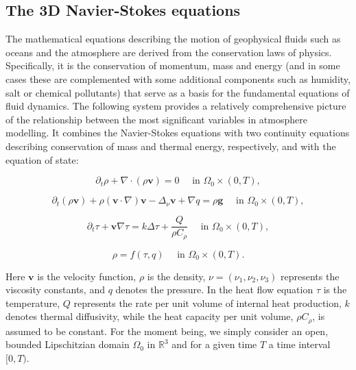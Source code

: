 \documentclass[12pt]{report}
\numberwithin{theorem}{chapter}
\numberwithin{corollary}{chapter}
\numberwithin{lemma}{chapter}
\numberwithin{remark}{chapter}
\numberwithin{definition}{chapter}
\numberwithin{prop}{chapter}
\begin{document}
\subsection{The 3D Navier-Stokes equations}\label{3DNSgeneraldescription}

The mathematical equations describing the motion of geophysical fluids such as oceans and the atmosphere are derived from the conservation laws of physics. Specifically, it is the conservation of momentum, mass and energy (and in some cases these are complemented with some additional components such as humidity, salt or chemical pollutants) that serve as a basis for the fundamental equations of fluid dynamics. The following system provides a relatively comprehensive picture of the relationship between the most significant variables in atmosphere modelling. It combines the Navier-Stokes equations with two continuity equations describing conservation of mass and thermal energy, respectively, and with the equation of state:

\begin{equation} \label{original_general_mass_cons}
  \partial_t \rho + \nabla \cdot (\rho \mathbf{v})  = 0 \quad \text{ in } \Omega_0 \times (0,T),
\end{equation}

\begin{equation} \label{original_general_NS}
  \partial_t (\rho \mathbf{v}) + \rho (\mathbf{v} \cdot \nabla)\mathbf{v} -\Delta_{\nu} \mathbf{v} + \nabla q = \rho \mathbf{g} \quad \text{ in } \Omega_0 \times (0,T),
\end{equation}

\begin{equation} \label{original_general_temperature}
  \partial_t \tau + \mathbf{v} \nabla \tau = k \Delta \tau + \frac{Q}{\rho C_\rho} \quad \text{ in } \Omega_0 \times (0,T),
\end{equation}

\begin{equation}\label{equation_of_state}
  \rho = f(\tau, q)  \quad \text{ in } \Omega_0 \times (0,T).
\end{equation}

Here $\mathbf{v}$ is the velocity function, $\rho$ is the density, $\nu = (\nu_1, \nu_2, \nu_3)$ represents the viscosity constants, and $q$ denotes the pressure. In the heat flow equation $\tau$ is the temperature, $Q$ represents the rate per unit volume of internal heat production, $k$ denotes thermal diffusivity, while the heat capacity per unit volume, $\rho C_\rho$, is assumed to be constant.
For the moment being, we simply consider an open, bounded Lipschitzian domain $\Omega_0$ in $\mathbb{R}^3$ and for a given time $T$ a time interval $[0,T).$
\end{document}

